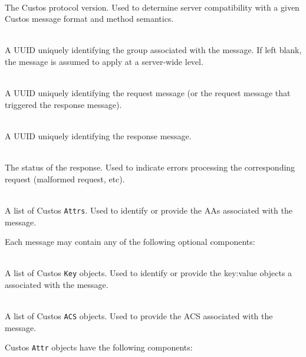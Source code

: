 \begin{packed_desc}
\item[\texttt{Version}] \hfill \\ The Custos protocol version. Used to
  determine server compatibility with a given Custos message format
  and method semantics.
\item[\texttt{Group}] \hfill \\ A UUID uniquely identifying the group
  associated with the message. If left blank, the message is assumed
  to apply at a server-wide level.
\item[\texttt{ReqID}] \hfill \\ A UUID uniquely identifying the
  request message (or the request message that triggered the response
  message).
\item[\texttt{ResID} (Response Only)] \hfill \\ A UUID uniquely
  identifying the response message.
\item[\texttt{Status} (Response Only)] \hfill \\ The status of the
  response. Used to indicate errors processing the corresponding
  request (malformed request, etc).
\item[\texttt{Attrs}] \hfill \\ A list of Custos \texttt{Attrs}. Used
  to identify or provide the AAs associated with the message.
\end{packed_desc}

\noindent
Each message may contain any of the following optional components:

\begin{packed_desc}
\item[\texttt{Keys}] \hfill \\ A list of Custos \texttt{Key}
  objects. Used to identify or provide the key:value objects a
  associated with the message.
\item[\texttt{ACSs}] \hfill \\ A list of Custos \texttt{ACS}
  objects. Used to provide the ACS associated with the message.
\end{packed_desc}

\noindent
Custos \texttt{Attr} objects have the following components:

